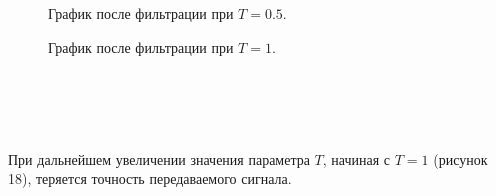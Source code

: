 \documentclass[a5paper, 10pt]{article}
\theoremstyle{definition}
\theoremstyle{plain}
\theoremstyle{remark}
\begin{document}
\begin{figure}[h!]
\caption{График после фильтрации при $T = 0.5$.}
\caption{График после фильтрации при $T = 1$.}
\end{figure}
\,\\
\\
\\
\\
При дальнейшем увеличении значения параметра $T$, начиная с $T= 1$ (рисунок 18), теряется точность передаваемого сигнала.
\end{document}
